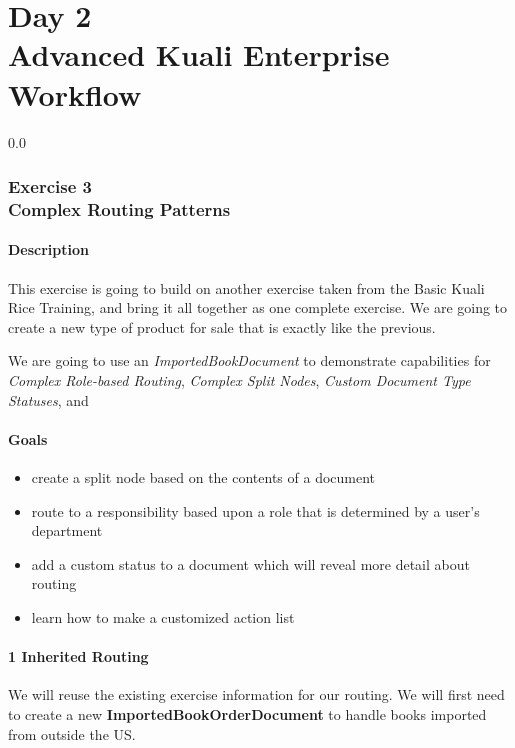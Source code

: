 \part*{Day 2\\
Advanced Kuali Enterprise Workflow}
{\setlength{\baselineskip}%
  {0.0\baselineskip}
  \section*{\flushright Exercise 3\\
  Complex Routing Patterns}
  \hrulefill \par}

\subsection*{Description}
This exercise is going to build on another exercise taken from the
Basic Kuali Rice Training, and bring it all together as one complete
exercise. We are going to create a new type of product for sale that
is exactly like the previous. 

We are going to use an \emph{ImportedBookDocument} to demonstrate
capabilities for \emph{Complex Role-based Routing}, \emph{Complex
  Split Nodes}, \emph{Custom Document Type Statuses}, and 

\subsection*{Goals}
\begin{itemize}
\item create a split node based on the contents of a document
\item route to a responsibility based upon a role that is determined
  by a user's department
\item add a custom status to a document which will reveal more detail
  about routing
\item learn how to make a customized action list
\end{itemize}

\subsection*{1 Inherited Routing}
We will reuse the existing exercise information for our routing. We
will first need to create a new \textbf{ImportedBookOrderDocument} to
handle books imported from outside the US.

